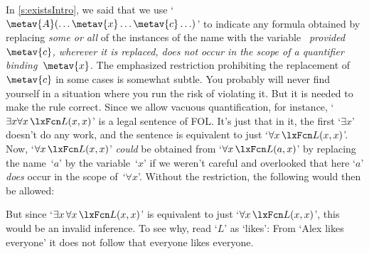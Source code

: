 In \cref{s:existsIntro}, we said that we use `$\metav{A}(\ldots
\metav{x} \ldots \metav{c}\ldots)$' to indicate any formula obtained
by replacing \emph{some or all} of the instances of the name 
with the variable~ \emph{provided~$\metav{c}$,
wherever it is replaced, does not occur in the scope of a quantifier
binding~$\metav{x}$}. The emphasized restriction prohibiting the
replacement of $\metav{c}$ in some cases is somewhat subtle. You
probably will never find yourself in a situation where you run the
risk of violating it. But it is needed to make the rule correct.
Since we allow vacuous quantification, for instance, `$\exists
x\forall x\,\atom{L}{x,x}$' is a legal sentence of FOL. It's just that
in it, the first `$\exists x$' doesn't do any work, and the sentence
is equivalent to just `$\forall x\,\atom{L}{x,x}$'. Now, `$\forall
x\,\atom{L}{x,x}$' \emph{could} be obtained from `$\forall
x\,\atom{L}{a,x}$' by replacing the name~`$a$' by the variable~`$x$'
if we weren't careful and overlooked that here `$a$' \emph{does} occur
in the scope of~`$\forall x$'. Without the restriction, the following
would then be allowed:
\begin{fitchproof}
		\PR
		\ifHTMLtarget
	\else
	\fi\end{fitchproof}
But since `$\exists x\, \forall x\, \atom{L}{x,x}$' is equivalent to
just `$\forall x\, \atom{L}{x,x}$', this would be an invalid inference.
To see why, read `$L$' as `likes': From `Alex likes everyone' it does
not follow that everyone likes everyone.

